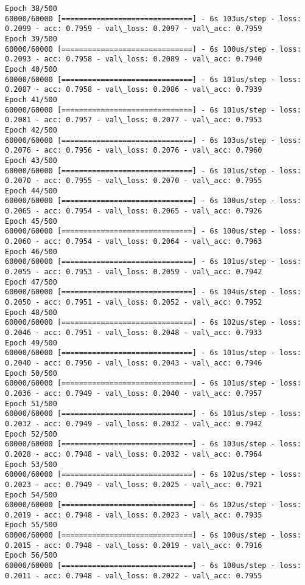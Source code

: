 \documentclass[11pt]{article}
\begin{document}
\begin{Verbatim}[commandchars=\\\{\}]
Epoch 38/500
60000/60000 [==============================] - 6s 103us/step - loss: 0.2099 - acc: 0.7959 - val\_loss: 0.2097 - val\_acc: 0.7959
Epoch 39/500
60000/60000 [==============================] - 6s 100us/step - loss: 0.2093 - acc: 0.7958 - val\_loss: 0.2089 - val\_acc: 0.7940
Epoch 40/500
60000/60000 [==============================] - 6s 101us/step - loss: 0.2087 - acc: 0.7958 - val\_loss: 0.2086 - val\_acc: 0.7939
Epoch 41/500
60000/60000 [==============================] - 6s 101us/step - loss: 0.2081 - acc: 0.7957 - val\_loss: 0.2077 - val\_acc: 0.7953
Epoch 42/500
60000/60000 [==============================] - 6s 103us/step - loss: 0.2076 - acc: 0.7956 - val\_loss: 0.2076 - val\_acc: 0.7960
Epoch 43/500
60000/60000 [==============================] - 6s 101us/step - loss: 0.2070 - acc: 0.7955 - val\_loss: 0.2070 - val\_acc: 0.7955
Epoch 44/500
60000/60000 [==============================] - 6s 100us/step - loss: 0.2065 - acc: 0.7954 - val\_loss: 0.2065 - val\_acc: 0.7926
Epoch 45/500
60000/60000 [==============================] - 6s 100us/step - loss: 0.2060 - acc: 0.7954 - val\_loss: 0.2064 - val\_acc: 0.7963
Epoch 46/500
60000/60000 [==============================] - 6s 101us/step - loss: 0.2055 - acc: 0.7953 - val\_loss: 0.2059 - val\_acc: 0.7942
Epoch 47/500
60000/60000 [==============================] - 6s 104us/step - loss: 0.2050 - acc: 0.7951 - val\_loss: 0.2052 - val\_acc: 0.7952
Epoch 48/500
60000/60000 [==============================] - 6s 102us/step - loss: 0.2046 - acc: 0.7951 - val\_loss: 0.2048 - val\_acc: 0.7933
Epoch 49/500
60000/60000 [==============================] - 6s 101us/step - loss: 0.2040 - acc: 0.7950 - val\_loss: 0.2043 - val\_acc: 0.7946
Epoch 50/500
60000/60000 [==============================] - 6s 101us/step - loss: 0.2036 - acc: 0.7949 - val\_loss: 0.2040 - val\_acc: 0.7957
Epoch 51/500
60000/60000 [==============================] - 6s 101us/step - loss: 0.2032 - acc: 0.7949 - val\_loss: 0.2032 - val\_acc: 0.7942
Epoch 52/500
60000/60000 [==============================] - 6s 103us/step - loss: 0.2028 - acc: 0.7948 - val\_loss: 0.2032 - val\_acc: 0.7964
Epoch 53/500
60000/60000 [==============================] - 6s 102us/step - loss: 0.2023 - acc: 0.7949 - val\_loss: 0.2025 - val\_acc: 0.7921
Epoch 54/500
60000/60000 [==============================] - 6s 102us/step - loss: 0.2019 - acc: 0.7948 - val\_loss: 0.2023 - val\_acc: 0.7935
Epoch 55/500
60000/60000 [==============================] - 6s 100us/step - loss: 0.2015 - acc: 0.7948 - val\_loss: 0.2019 - val\_acc: 0.7916
Epoch 56/500
60000/60000 [==============================] - 6s 100us/step - loss: 0.2011 - acc: 0.7948 - val\_loss: 0.2022 - val\_acc: 0.7955

\end{Verbatim}
\end{document}
